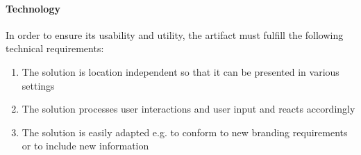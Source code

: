 \paragraph{Technology} In order to ensure its usability and utility, the artifact must fulfill the following technical requirements:
\begin{enumerate}
\setcounter{enumi}{\value{foo}}
    \item The solution is location independent so that it can be presented in various settings
    \item The solution processes user interactions and user input and reacts accordingly
    \item The solution is easily adapted e.g. to conform to new branding requirements or to include new information
\end{enumerate}



